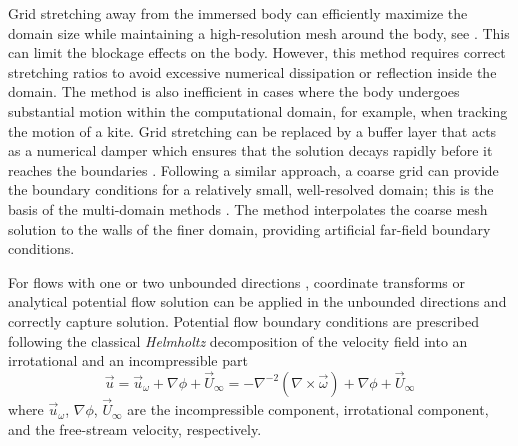 \documentclass[preprint,12pt]{elsarticle}
\begin{document}
Grid stretching away from the immersed body can efficiently maximize the domain size while maintaining a high-resolution mesh around the body, see \cite{Maertens2015, Lauber2022}. This can limit the blockage effects on the body. However, this method requires correct stretching ratios to avoid excessive numerical dissipation or reflection inside the domain. The method is also inefficient in cases where the body undergoes substantial motion within the computational domain, for example, when tracking the motion of a kite. Grid stretching can be replaced by a buffer layer that acts as a numerical damper which ensures that the solution decays rapidly before it reaches the boundaries \cite{Colonius2002ADomains}. Following a similar approach, a coarse grid can provide the boundary conditions for a relatively small, well-resolved domain; this is the basis of the multi-domain methods \cite{Colonius2008}. The method interpolates the coarse mesh solution to the walls of the finer domain, providing artificial far-field boundary conditions.

For flows with one \cite{Grosch1977NumericalTransforms, Levy2022SolvingMethod} or two unbounded directions \cite{Rennich1997NumericalDirections}, coordinate transforms or analytical potential flow solution can be applied in the unbounded directions and correctly capture solution. Potential flow boundary conditions are prescribed following the classical \emph{Helmholtz} decomposition of the velocity field into an irrotational and an incompressible part
\begin{equation}\label{eq:u_vort}
    \vec{u} = \vec{u}_\omega + \nabla\phi + \vec{U}_\infty = -\nabla^{-2}\left(\nabla \times \vec{\omega}\right) + \nabla\phi + \vec{U}_\infty
\end{equation}
where $\vec{u}_\omega$, $\nabla\phi$, $\vec{U}_\infty$ are the incompressible component, irrotational component, and the free-stream velocity, respectively. 

\end{document}
